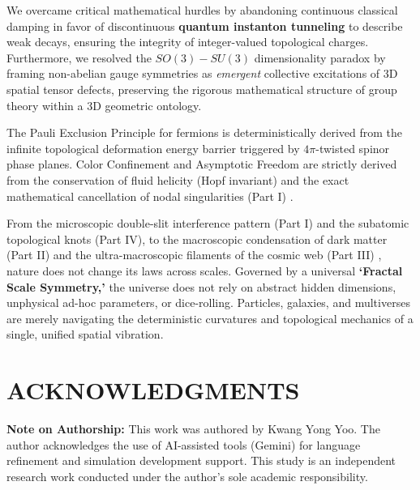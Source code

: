 \documentclass[reprint,amsmath,amssymb,aps,prd]{revtex4-2}
\begin{document}
We overcame critical mathematical hurdles by abandoning continuous classical damping in favor of discontinuous \textbf{quantum instanton tunneling} to describe weak decays, ensuring the integrity of integer-valued topological charges. Furthermore, we resolved the $SO(3)-SU(3)$ dimensionality paradox by framing non-abelian gauge symmetries as \textit{emergent} collective excitations of 3D spatial tensor defects, preserving the rigorous mathematical structure of group theory within a 3D geometric ontology. 

The Pauli Exclusion Principle for fermions is deterministically derived from the infinite topological deformation energy barrier triggered by $4\pi$-twisted spinor phase planes. Color Confinement and Asymptotic Freedom are strictly derived from the conservation of fluid helicity (Hopf invariant) \cite{Moffatt1969} and the exact mathematical cancellation of nodal singularities (Part I) \cite{YooPart1, Gross1973}.

From the microscopic double-slit interference pattern (Part I) and the subatomic topological knots (Part IV), to the macroscopic condensation of dark matter (Part II) \cite{YooPart2} and the ultra-macroscopic filaments of the cosmic web (Part III) \cite{YooPart3}, nature does not change its laws across scales. Governed by a universal \textbf{`Fractal Scale Symmetry,'} the universe does not rely on abstract hidden dimensions, unphysical ad-hoc parameters, or dice-rolling. Particles, galaxies, and multiverses are merely navigating the deterministic curvatures and topological mechanics of a single, unified spatial vibration.

\vspace{1em}
\section*{ACKNOWLEDGMENTS}
\textbf{Note on Authorship:} This work was authored by Kwang Yong Yoo. The author acknowledges the use of AI-assisted tools (Gemini) for language refinement and simulation development support. This study is an independent research work conducted under the author's sole academic responsibility.
\end{document}
